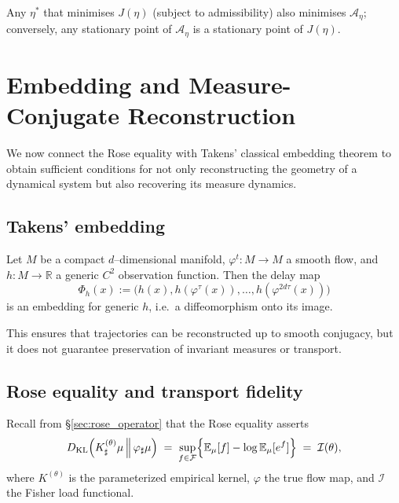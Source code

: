 \begin{corollary}
\label{cor:stationary}
Any $\eta^\ast$ that minimises $J(\eta)$ (subject to admissibility) also minimises $\mathcal A_\eta$; conversely, any stationary point of $\mathcal A_\eta$ is a stationary point of $J(\eta)$.
\end{corollary}

\section{Embedding and Measure-Conjugate Reconstruction}
\label{sec:rose_takens}

We now connect the Rose equality with Takens’ classical embedding theorem
to obtain sufficient conditions for not only reconstructing the geometry
of a dynamical system but also recovering its measure dynamics.

\subsection{Takens’ embedding}
\label{subsec:takens}
\begin{theorem}
Let $M$ be a compact $d$–dimensional manifold, $\varphi^t:M\to M$ a smooth
flow, and $h:M\to\mathbb R$ a generic $C^2$ observation function.
Then the delay map
\[
   \Phi_h(x) := \bigl(h(x),h(\varphi^\tau(x)),\dots,h(\varphi^{2d\tau}(x))\bigr)
\]
is an embedding for generic $h$, i.e.\ a diffeomorphism onto its image.
\end{theorem}

\noindent
This ensures that trajectories can be reconstructed up to smooth conjugacy,
but it does not guarantee preservation of invariant measures or transport.

\subsection{Rose equality and transport fidelity}
\label{subsec:rose_transport}
Recall from \S\ref{sec:rose_operator} that the Rose equality asserts
\[
   D_{\mathrm{KL}}\!\left(
      K^{(\theta)}_\sharp \mu
      \,\Big\|\, 
      \varphi_\sharp \mu
   \right)
   \;=\;
   \sup_{f \in \mathcal F}
   \Bigl\{ \mathbb E_\mu[f] - \log \mathbb E_\mu[e^f] \Bigr\}
   \;=\; \mathcal I(\theta),
\]
where $K^{(\theta)}$ is the parameterized empirical kernel,
$\varphi$ the true flow map, and $\mathcal I$ the Fisher load functional.


